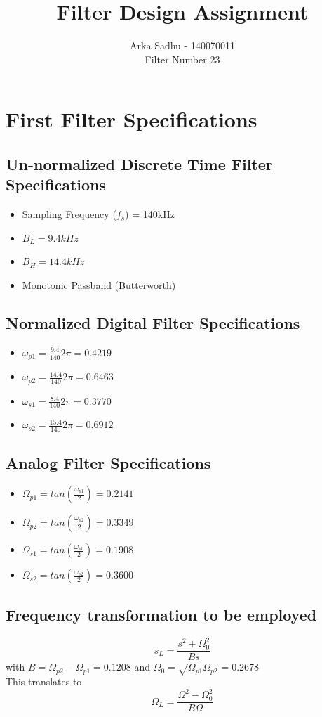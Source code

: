 \documentclass[22pt]{article}
\title{ \huge{\textbf{Filter Design Assignment}}}
\author{
  Arka Sadhu - 140070011\\
  Filter Number 23
}
\begin{document}
\maketitle

\tableofcontents
\newpage
\section{First Filter Specifications}
\subsection{Un-normalized Discrete Time Filter Specifications}
\begin{itemize}
\item Sampling Frequency ($f_s$) = 140kHz
\item $B_L = 9.4 kHz$
\item $B_H = 14.4 kHz$
\item Monotonic Passband (Butterworth)
\end{itemize}
\subsection{Normalized Digital Filter Specifications}
\begin{itemize}
\item $\omega_{p1} = \frac{9.4}{140}2\pi = 0.4219$
\item $\omega_{p2} = \frac{14.4}{140}2\pi = 0.6463$
\item $\omega_{s1} = \frac{8.4}{140}2\pi = 0.3770$
\item $\omega_{s2} = \frac{15.4}{140}2\pi = 0.6912$
\end{itemize}
\subsection{Analog Filter Specifications}
\begin{itemize}
\item $\Omega_{p1} = tan(\frac{\omega_{p1}}{2}) = 0.2141$ 
\item $\Omega_{p2} = tan(\frac{\omega_{p2}}{2}) = 0.3349$
\item $\Omega_{s1} = tan(\frac{\omega_{s1}}{2}) = 0.1908$
\item $\Omega_{s2} = tan(\frac{\omega_{s2}}{2}) = 0.3600$
\end{itemize}
\subsection{ Frequency transformation to be employed}
\begin{equation}
  \label{eq:1}
  s_L = \frac{s^2 + \Omega_0^2}{Bs}
\end{equation}
with $B = \Omega_{p2} - \Omega_{p1} = 0.1208$ and $\Omega_0 = \sqrt{\Omega_{p1}\Omega_{p2}} = 0.2678$
\\  This translates to
\begin{equation}
  \label{eq:2}
  \Omega_{L} = \frac{\Omega^2 - \Omega_0^2}{B\Omega}
\end{equation}
\end{document}
